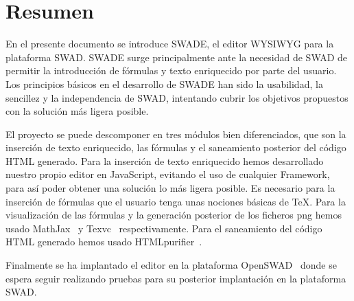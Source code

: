 \chapter*{Resumen}

En el presente documento se introduce SWADE, el editor WYSIWYG para la plataforma SWAD. SWADE surge principalmente ante la necesidad de SWAD de permitir la introducción de fórmulas y texto enriquecido por parte del usuario. Los principios básicos en el desarrollo  de SWADE han sido la usabilidad, la sencillez y la independencia de SWAD, intentando cubrir los objetivos propuestos con la solución más ligera posible. 

El proyecto se puede descomponer en tres módulos bien diferenciados, que son la inserción de texto enriquecido, las fórmulas y el saneamiento posterior del código HTML generado. Para la inserción de texto enriquecido hemos desarrollado nuestro propio editor en JavaScript, evitando el uso de cualquier Framework, para así poder obtener una solución lo más ligera posible. Es necesario para la inserción de fórmulas que el usuario tenga unas nociones básicas de TeX. Para la visualización de las fórmulas y la generación posterior de los ficheros png hemos usado MathJax~\cite{mathjax} y Texvc~\cite{texvc} respectivamente. Para el saneamiento del código HTML generado hemos usado HTMLpurifier~\cite{htmlpurifier}.   

Finalmente se ha implantado el editor en la plataforma OpenSWAD~\cite{openswad} donde se espera seguir realizando pruebas para su posterior implantación en la plataforma SWAD. 

